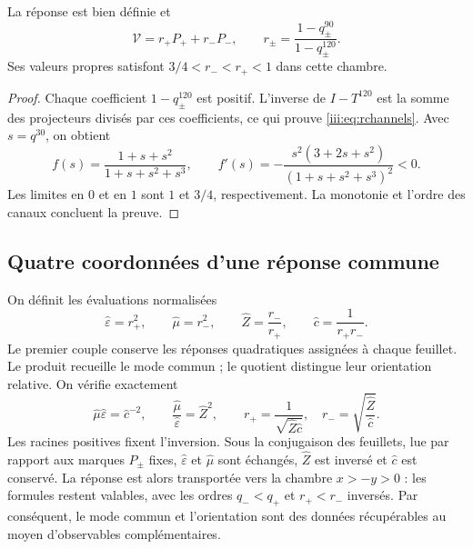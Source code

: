 \begin{proposition}
La réponse est bien définie et
\begin{equation}
 \mathcal V=r_+P_++r_-P_-,\qquad
 r_\pm=\frac{1-q_\pm^{90}}{1-q_\pm^{120}}.
 \label{iii:eq:rchannels}
\end{equation}
Ses valeurs propres satisfont $3/4<r_-<r_+<1$ dans cette chambre.
\end{proposition}
\begin{proof}
Chaque coefficient $1-q_\pm^{120}$ est positif. L'inverse de $I-T^{120}$ est la somme des projecteurs divisés par ces coefficients, ce qui prouve \eqref{iii:eq:rchannels}. Avec $s=q^{30}$, on obtient
\begin{equation}
 f(s)=\frac{1+s+s^2}{1+s+s^2+s^3},\qquad
 f'(s)=-\frac{s^2(3+2s+s^2)}{(1+s+s^2+s^3)^2}<0.
 \label{iii:eq:monotone}
\end{equation}
Les limites en $0$ et en $1$ sont $1$ et $3/4$, respectivement. La monotonie
et l’ordre des canaux concluent la preuve.
\end{proof}

\subsection{Quatre coordonnées d’une réponse commune}

On définit les évaluations normalisées
\begin{equation}
 \widehat\varepsilon=r_+^2,\qquad
 \widehat\mu=r_-^2,\qquad
 \widehat Z=\frac{r_-}{r_+},\qquad
 \widehat c=\frac1{r_+r_-}.
 \label{iii:eq:four}
\end{equation}
Le premier couple conserve les réponses quadratiques assignées à chaque feuillet.
Le produit recueille le mode commun ; le quotient distingue leur orientation relative.
On vérifie exactement
\begin{equation}
 \widehat\mu\widehat\varepsilon=\widehat c^{-2},\qquad
 \frac{\widehat\mu}{\widehat\varepsilon}=\widehat Z^2,
 \qquad
 r_+=\frac1{\sqrt{\widehat Z\widehat c}},\quad
 r_-=\sqrt{\frac{\widehat Z}{\widehat c}}.
 \label{iii:eq:four-identities}
\end{equation}
Les racines positives fixent l'inversion. Sous la conjugaison des feuillets, lue par rapport aux marques $P_\pm$ fixes, $\widehat\varepsilon$ et $\widehat\mu$ sont échangés, $\widehat Z$ est inversé et $\widehat c$ est conservé. La réponse est alors transportée vers la chambre $x>-y>0$ : les formules restent valables, avec les ordres $q_-<q_+$ et $r_+<r_-$ inversés. Par conséquent, le mode commun et l'orientation sont des données récupérables au moyen d'observables complémentaires.

